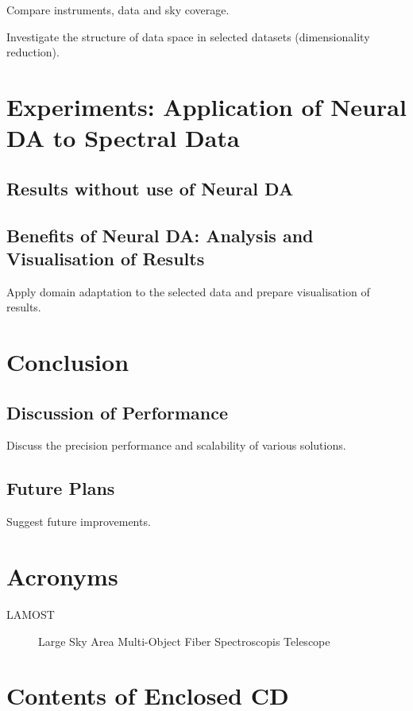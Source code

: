 \documentclass[thesis=M,english]{FITthesis}[2012/10/20]
\begin{document}
Compare instruments, data and sky coverage.

Investigate the structure of data space in selected datasets (dimensionality reduction).

\chapter{Experiments: Application of Neural DA to Spectral Data}
\label{exp_chapter}

\section{Results without use of Neural DA}

\section{Benefits of Neural DA: Analysis and Visualisation of Results}

Apply domain adaptation to the selected data
and prepare visualisation of results.

\chapter{Conclusion}

\section{Discussion of Performance}

Discuss the precision performance and scalability of various solutions.

\section{Future Plans}

Suggest future improvements.




\appendix

\chapter{Acronyms}
\begin{description}
    \item[LAMOST] Large Sky Area Multi-Object Fiber Spectroscopis Telescope
\end{description}

\chapter{Contents of Enclosed CD}

\begin{figure}
\end{figure}
\end{document}
